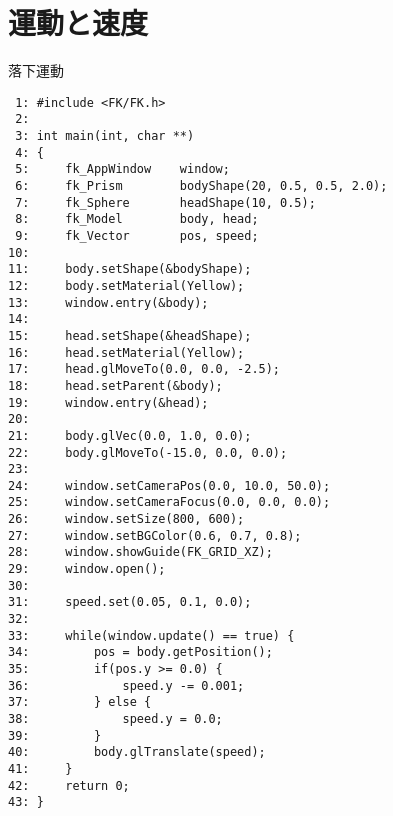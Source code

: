 \section{運動と速度} \label{sec:07-fall}
\begin{itembox}[l]{落下運動}
\begin{small}
\begin{verbatim}
 1: #include <FK/FK.h>
 2: 
 3: int main(int, char **)
 4: {
 5:     fk_AppWindow    window;
 6:     fk_Prism        bodyShape(20, 0.5, 0.5, 2.0);
 7:     fk_Sphere       headShape(10, 0.5);
 8:     fk_Model        body, head;
 9:     fk_Vector       pos, speed;
10: 
11:     body.setShape(&bodyShape);
12:     body.setMaterial(Yellow);
13:     window.entry(&body);
14: 
15:     head.setShape(&headShape);
16:     head.setMaterial(Yellow);
17:     head.glMoveTo(0.0, 0.0, -2.5);
18:     head.setParent(&body);
19:     window.entry(&head);
20: 
21:     body.glVec(0.0, 1.0, 0.0);
22:     body.glMoveTo(-15.0, 0.0, 0.0);
23: 
24:     window.setCameraPos(0.0, 10.0, 50.0);
25:     window.setCameraFocus(0.0, 0.0, 0.0);
26:     window.setSize(800, 600);
27:     window.setBGColor(0.6, 0.7, 0.8);
28:     window.showGuide(FK_GRID_XZ);
29:     window.open();
30: 
31:     speed.set(0.05, 0.1, 0.0);
32: 
33:     while(window.update() == true) {
34:         pos = body.getPosition();
35:         if(pos.y >= 0.0) {
36:             speed.y -= 0.001;
37:         } else {
38:             speed.y = 0.0;
39:         }
40:         body.glTranslate(speed);
41:     }
42:     return 0;
43: }
\end{verbatim}
\end{small}
\end{itembox}
